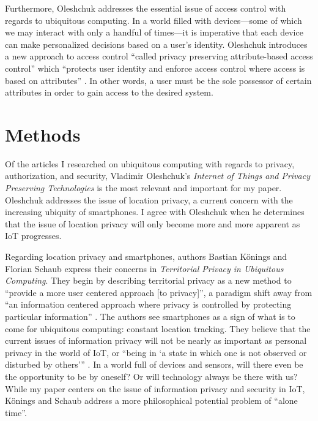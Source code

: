 \documentclass[11pt, oneside]{article}   	%
\begin{document}
Furthermore, Oleshchuk addresses the essential issue of access control with regards to ubiquitous computing. In a world filled with devices---some of which we may interact with only a handful of times---it is imperative that each device can make personalized decisions based on a user's identity. Oleshchuk introduces a new approach to access control ``called privacy preserving attribute-based access control'' which ``protects user identity and enforce access control where access is based on attributes'' \cite{oleshchuk}. In other words, a user must be the sole possessor of certain attributes in order to gain access to the desired system.

\section{Methods}
Of the articles I researched on ubiquitous computing with regards to privacy, authorization, and security, Vladimir Oleshchuk's \textit{Internet of Things and Privacy Preserving Technologies} is the most relevant and important for my paper. Oleshchuk addresses the issue of location privacy, a current concern with the increasing ubiquity of smartphones. I agree with Oleshchuk when he determines that the issue of location privacy will only become more and more apparent as IoT progresses.

Regarding location privacy and smartphones, authors Bastian K{\"o}nings and Florian Schaub express their concerns in \textit{Territorial Privacy in Ubiquitous Computing}. They begin by describing territorial privacy as a new method to ``provide a more user centered approach [to privacy]'', a paradigm shift away from ``an information centered approach where privacy is controlled by protecting particular information'' \cite{koningsandschaub}. The authors see smartphones as a sign of what is to come for ubiquitous computing: constant location tracking. They believe that the current issues of information privacy will not be nearly as important as personal privacy in the world of IoT, or ``being in `a state in which one is not observed or disturbed by others''' \cite{koningsandschaub}. In a world full of devices and sensors, will there even be the opportunity to be by oneself? Or will technology always be there with us? While my paper centers on the issue of information privacy and security in IoT, K{\"o}nings and Schaub address a more philosophical potential problem of ``alone time''.
\end{document}

